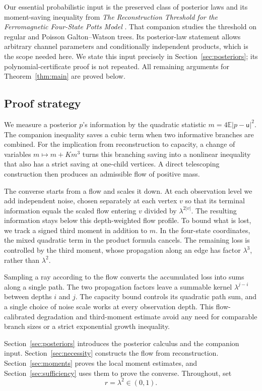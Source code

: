 \documentclass[11pt]{article}
\numberwithin{equation}{section}
\newcommand{\E}{\mathbb E}
\newcommand{\unif}{\mathsf u}
\begin{document}
Our essential probabilistic input is the preserved class of
posterior laws and its moment-saving inequality from
\emph{The Reconstruction Threshold for the Ferromagnetic Four-State
Potts Model} \cite[Proposition~3.2]{OpenAI26Potts}. That companion
studies the threshold on regular and Poisson Galton--Watson trees.
Its posterior-law statement allows arbitrary channel parameters
and conditionally independent products, which is the scope
needed here. We state this input precisely in
Section~\ref{sec:posteriors}; its polynomial-certificate proof is
not repeated. All remaining arguments for Theorem~\ref{thm:main}
are proved below.

\subsection*{Proof strategy}
We measure a posterior $p$'s information by the quadratic statistic
$m=4\E|p-\unif|^2$. The companion inequality saves a cubic term when two
informative branches are combined. For the implication from
reconstruction to capacity, a change of variables $m\mapsto m+Km^3$
turns this branching saving into a nonlinear inequality that also
has a strict saving at one-child vertices. A direct telescoping
construction then produces an admissible flow of positive mass.

The converse starts from a flow and scales it down. At each
observation level we add independent noise, chosen separately at
each vertex $v$ so that its terminal information equals the
scaled flow entering $v$ divided by $\lambda^{2|v|}$.
The resulting information stays below this depth-weighted flow profile.
To bound what is lost, we track a signed third moment in addition
to $m$. In the four-state coordinates, the mixed quadratic term
in the product formula cancels. The remaining loss is controlled
by the third moment, whose propagation along an edge has factor
$\lambda^3$, rather than $\lambda^2$.

Sampling a ray according to the flow converts the accumulated
loss into sums along a single path. The two propagation factors
leave a summable kernel $\lambda^{j-i}$ between depths $i$ and
$j$. The capacity bound controls its quadratic path sum, and a
single choice of noise scale works at every observation depth.
This flow-calibrated degradation and third-moment estimate avoid
any need for comparable branch sizes or a strict exponential
growth inequality.

Section~\ref{sec:posteriors} introduces the posterior calculus
and the companion input. Section~\ref{sec:necessity} constructs
the flow from reconstruction. Section~\ref{sec:moments} proves
the local moment estimates, and Section~\ref{sec:sufficiency}
uses them to prove the converse. Throughout, set
\[
 r=\lambda^2\in(0,1).
\]
\end{document}
